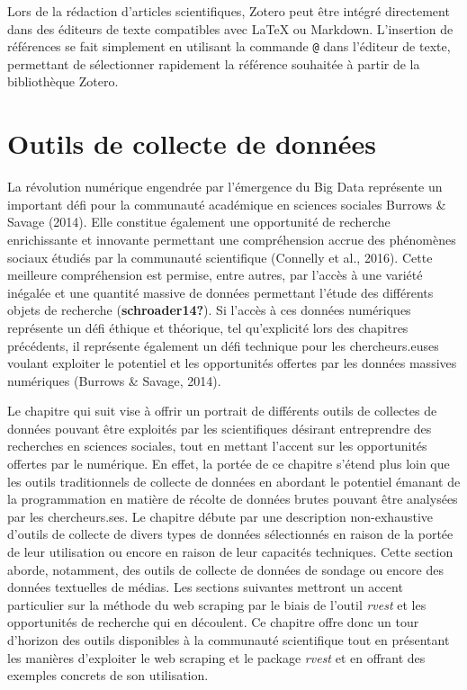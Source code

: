 \documentclass[
  letterpaper,
  DIV=11,
  numbers=noendperiod]{scrreprt}
\begin{document}
Lors de la rédaction d'articles scientifiques, Zotero peut être intégré
directement dans des éditeurs de texte compatibles avec LaTeX ou
Markdown. L'insertion de références se fait simplement en utilisant la
commande \texttt{@} dans l'éditeur de texte, permettant de sélectionner
rapidement la référence souhaitée à partir de la bibliothèque Zotero.


\hypertarget{sec-chap5}{%
\chapter{Outils de collecte de données}\label{sec-chap5}}

La révolution numérique engendrée par l'émergence du Big Data représente
un important défi pour la communauté académique en sciences sociales
Burrows \& Savage (2014). Elle constitue également une opportunité de
recherche enrichissante et innovante permettant une compréhension accrue
des phénomènes sociaux étudiés par la communauté scientifique (Connelly
et al., 2016). Cette meilleure compréhension est permise, entre autres,
par l'accès à une variété inégalée et une quantité massive de données
permettant l'étude des différents objets de recherche
(\textbf{schroader14?}). Si l'accès à ces données numériques représente
un défi éthique et théorique, tel qu'explicité lors des chapitres
précédents, il représente également un défi technique pour les
chercheurs.euses voulant exploiter le potentiel et les opportunités
offertes par les données massives numériques (Burrows \& Savage, 2014).

Le chapitre qui suit vise à offrir un portrait de différents outils de
collectes de données pouvant être exploités par les scientifiques
désirant entreprendre des recherches en sciences sociales, tout en
mettant l'accent sur les opportunités offertes par le numérique. En
effet, la portée de ce chapitre s'étend plus loin que les outils
traditionnels de collecte de données en abordant le potentiel émanant de
la programmation en matière de récolte de données brutes pouvant être
analysées par les chercheurs.ses. Le chapitre débute par une description
non-exhaustive d'outils de collecte de divers types de données
sélectionnés en raison de la portée de leur utilisation ou encore en
raison de leur capacités techniques. Cette section aborde, notamment,
des outils de collecte de données de sondage ou encore des données
textuelles de médias. Les sections suivantes mettront un accent
particulier sur la méthode du web scraping par le biais de l'outil
\emph{rvest} et les opportunités de recherche qui en découlent. Ce
chapitre offre donc un tour d'horizon des outils disponibles à la
communauté scientifique tout en présentant les manières d'exploiter le
web scraping et le package \emph{rvest} et en offrant des exemples
concrets de son utilisation.
\end{document}
